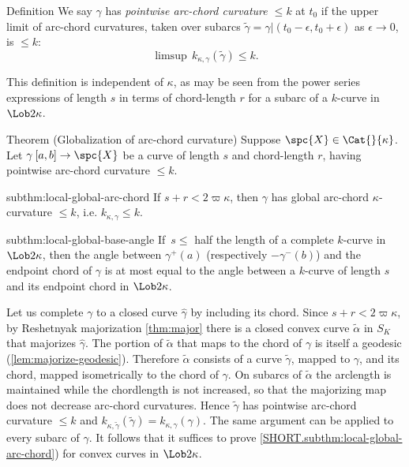 \begin{thm}{Definition}
\label{ptwise-arc-chord}
 We say $\gamma$ has \emph{pointwise arc-chord curvature $\le k$} at $t_0$ if 
 the upper limit of arc-chord curvatures, taken over 
subarcs $ \tilde \gamma=\gamma|(t_0-\epsilon,t_0+\epsilon)$ as $\epsilon\to 0$, is $\le k$: 
$$ \limsup \,k_{\kappa,\gamma}( \tilde \gamma)\le k.$$  
\end{thm}


This definition is independent of $\kappa$, as may be seen from the power series expressions of length $s$ in terms of chord-length $r$ for a subarc of a $k$-curve in $\Lob2{\kappa}$.

\begin{thm}{Theorem (Globalization of arc-chord curvature)}\label{thm:globa-arc-chord}
  Suppose $\spc{X}\in\Cat{}{\kappa}$. Let $\gamma\:[a,b]\to\spc{X}$ be a curve of length $s$ and chord-length $r$, having pointwise arc-chord curvature
$ \le k$.  
\begin{subthm}{subthm:local-global-arc-chord}
If $s+r<2\varpi\kappa$, then
$\gamma$ has global arc-chord $\kappa$-curvature $\le k$, i.e.  $k_{\kappa,\gamma} \le k$. 
\end{subthm}
\begin{subthm}{subthm:local-global-base-angle}
If \,$s\le$ half the length of a complete $k$-curve in $\Lob2{\kappa}$, then  
the angle between $\gamma^+(a)$ (respectively $-\gamma^-(b)$)  and the endpoint chord of $\gamma$ is at most equal to the angle between a $k$-curve of length $s$ and  its endpoint chord in $\Lob2{\kappa}$.
\end{subthm}{}
\end{thm}

Let us complete $\gamma$
to a closed curve $\hat\gamma$ by including its chord. Since $s+r<2\varpi\kappa$, by Reshetnyak
majorization  \ref{thm:major} there is a closed convex curve $\tilde\alpha$ in $S_K$ that
majorizes $\hat\gamma$. The portion of $\tilde\alpha$ that maps to the
chord of $\gamma$ is itself a  geodesic (\ref{lem:majorize-geodesic}).  Therefore
$\tilde\alpha$ consists of a curve $\tilde\gamma$, mapped to $\gamma$, and its
chord, mapped isometrically to the chord of $\gamma$. On subarcs of
$\tilde\alpha$ the arclength is maintained while the chordlength is not
increased, so that the majorizing map does not decrease arc-chord
curvatures. Hence $\tilde\gamma$  has pointwise arc-chord curvature $\le k$  and  $k_{\kappa,\tilde\gamma}(\tilde\gamma)= k_{\kappa,\gamma}(\gamma)$. The same argument can be applied to every subarc of $\gamma$.
It follows that it suffices to prove \ref{SHORT.subthm:local-global-arc-chord}) for convex curves in $\Lob2\kappa$.  

